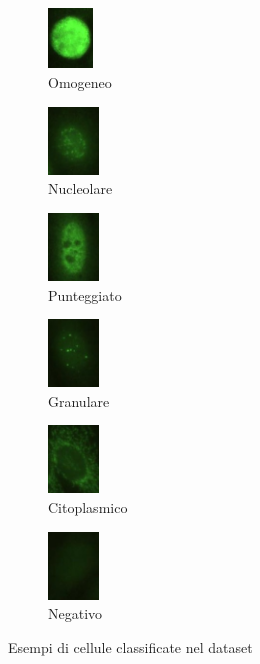 \begin{figure}[H]
\captionsetup[subfigure]{labelformat=empty}
\begin{subfigure}{.16\textwidth}
\centering
\includegraphics[height=1.6cm]{images/omogeneo.jpg}
\caption{Omogeneo}
\end{subfigure}%
\begin{subfigure}{.16\textwidth}
\centering
\includegraphics[height=1.8cm]{images/nucleolare.jpg}
\caption{Nucleolare}
\end{subfigure}%
\begin{subfigure}{.16\textwidth}
\centering
\includegraphics[height=1.8cm]{images/punteggiato.jpg}
\caption{Punteggiato}
\end{subfigure}%
\begin{subfigure}{.16\textwidth}
\centering
\includegraphics[height=1.8cm]{images/granulare.jpg}
\caption{Granulare}
\end{subfigure}%
\begin{subfigure}{.16\textwidth}
\centering
\includegraphics[height=1.8cm]{images/citoplasmico.jpg}
\caption{Citoplasmico}
\end{subfigure}%
\begin{subfigure}{.16\textwidth}
\centering
\includegraphics[height=1.8cm]{images/negativo.jpg}
\caption{Negativo}
\end{subfigure}%
\caption{Esempi di cellule classificate nel dataset}
\end{figure}
